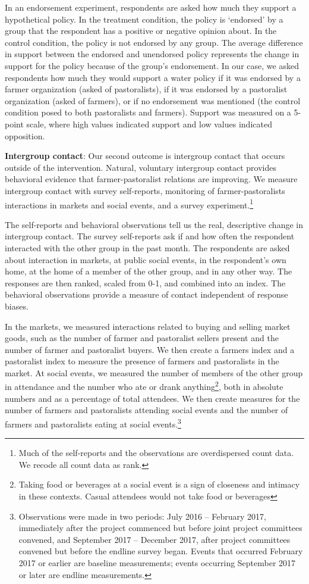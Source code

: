 \documentclass[11pt]{article}
\begin{document}
In an endorsement experiment, respondents are asked how much they
support a hypothetical policy. In the treatment condition, the policy is
`endorsed' by a group that the respondent has a positive or negative
opinion about. In the control condition, the policy is not endorsed by
any group. The average difference in support between the endorsed and
unendorsed policy represents the change in support for the policy
because of the group's endorsement. In our case, we asked respondents
how much they would support a water policy if it was endorsed by a
farmer organization (asked of pastoralists), if it was endorsed by a
pastoralist organization (asked of farmers), or if no endorsement was
mentioned (the control condition posed to both pastoralists and
farmers). Support was measured on a 5-point scale, where high values
indicated support and low values indicated opposition.

\textbf{Intergroup contact}: Our second outcome is intergroup contact
that occurs outside of the intervention. Natural, voluntary intergroup
contact provides behavioral evidence that farmer-pastoralist relations
are improving. We measure intergroup contact with survey self-reports,
monitoring of farmer-pastoralists interactions in markets and social
events, and a survey experiment.\footnote{Much of the self-reports and
  the observations are overdispersed count data. We recode all count
  data as rank.}

The self-reports and behavioral observations tell us the real,
descriptive change in intergroup contact. The survey self-reports ask if
and how often the respondent interacted with the other group in the past
month. The respondents are asked about interaction in markets, at public
social events, in the respondent's own home, at the home of a member of
the other group, and in any other way. The responses are then ranked,
scaled from 0-1, and combined into an index. The behavioral observations
provide a measure of contact independent of response biases.

In the markets, we measured interactions related to buying and selling
market goods, such as the number of farmer and pastoralist sellers
present and the number of farmer and pastoralist buyers. We then create
a farmers index and a pastoralist index to measure the presence of
farmers and pastoralists in the market. At social events, we measured
the number of members of the other group in attendance and the number
who ate or drank anything\footnote{Taking food or beverages at a social
  event is a sign of closeness and intimacy in these contexts. Casual
  attendees would not take food or beverages}, both in absolute numbers
and as a percentage of total attendees. We then create measures for the
number of farmers and pastoralists attending social events and the
number of farmers and pastoralists eating at social events.\footnote{Observations
  were made in two periods: July 2016 -- February 2017, immediately
  after the project commenced but before joint project committees
  convened, and September 2017 -- December 2017, after project
  committees convened but before the endline survey began. Events that
  occurred February 2017 or earlier are baseline measurements; events
  occurring September 2017 or later are endline measurements.}
\end{document}
